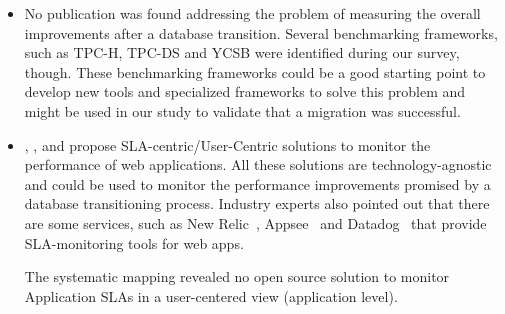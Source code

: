 \begin{itemize}
\item{No publication was found addressing the problem of measuring the overall improvements after a database transition. Several benchmarking frameworks, such as TPC-H, TPC-DS and YCSB were identified\cite{6616442} during our survey, though. These benchmarking frameworks could be a good starting point to develop new tools and specialized frameworks to solve this problem and might be used in our study to validate that a migration was successful.
}

\item{ \cite{6253526}, \cite{6461875}, \cite{6511780} and \cite{Xiong:2011:APA:2038916.2038931} propose SLA-centric/User-Centric solutions to monitor the performance of web applications. All these solutions are technology-agnostic and could be used to monitor the performance improvements promised by a database transitioning process. Industry experts also pointed out that there are some services, such as New Relic~\cite{newrelic}, Appsee~\cite{appsee} and Datadog~\cite{datadog} that provide SLA-monitoring tools for web apps. 

The systematic mapping revealed no open source solution to monitor Application SLAs in a user-centered view (application level).  
}

\end{itemize}



